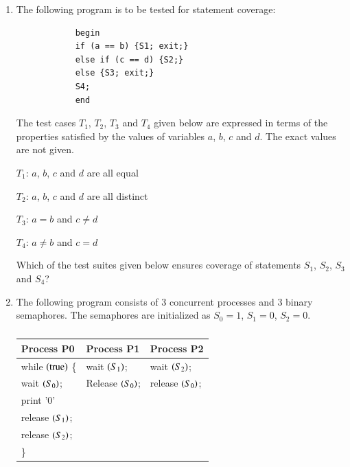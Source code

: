 \documentclass[journal,12pt,onecolumn]{IEEEtran}
\theoremstyle{remark}
\begin{document}
\begin{enumerate}
		\item The following program is to be tested for statement coverage:
		\begin{verbatim}
			begin
			if (a == b) {S1; exit;}
			else if (c == d) {S2;}
			else {S3; exit;}
			S4;
			end
		\end{verbatim}
		
		The test cases $T_1$, $T_2$, $T_3$ and $T_4$ given below are expressed in terms of the properties satisfied by the values of variables $a$, $b$, $c$ and $d$. The exact values are not given.
		
		$T_1$: $a$, $b$, $c$ and $d$ are all equal
		
		$T_2$: $a$, $b$, $c$ and $d$ are all distinct
		
		$T_3$: $a = b$ and $c \neq d$
		
		$T_4$: $a \neq b$ and $c = d$
		
		Which of the test suites given below ensures coverage of statements $S_1$, $S_2$, $S_3$ and $S_4$?
		
		\hfill{}
		
		\begin{enumerate}
		\end{enumerate}
		
		\item The following program consists of $3$ concurrent processes and $3$ binary semaphores. The semaphores are initialized as $S_0 = 1$, $S_1 = 0$, $S_2 = 0$.
		
		\begin{table}[h]
			\centering
			\caption*{}
			\label{tab:processes}
			\begin{tabular}{|l|l|l|}
				\hline
				Process P0 & Process P1 & Process P2 \\
				\hline
				while $\left(\text{true}\right)$ \{ & wait $\left(S_1\right)$; & wait $\left(S_2\right)$; \\
				\quad wait $\left(S_0\right)$; & Release $\left(S_0\right)$; & release $\left(S_0\right)$; \\
				\quad print '0' & & \\
				\quad release $\left(S_1\right)$; & & \\
				\quad release $\left(S_2\right)$; & & \\
				\} & & \\
				\hline
			\end{tabular}
		\end{table}
		

\end{enumerate}
\end{document}
